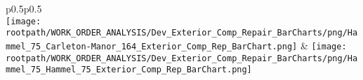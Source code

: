                         \begin{center}
                        \tablehead{\hspace{1cm}\\}
                        \tabletail{\hspace{1cm}\\}
                        \begin{supertabular}{p{0.5\textwidth}p{0.5\textwidth}}
                         \\
                        \texttt{[image: \\rootpath/WORK\_ORDER\_ANALYSIS/Dev\_Exterior\_Comp\_Repair\_BarCharts/png/Hammel\_75\_Carleton-Manor\_164\_Exterior\_Comp\_Rep\_BarChart.png]} & \texttt{[image: \\rootpath/WORK\_ORDER\_ANALYSIS/Dev\_Exterior\_Comp\_Repair\_BarCharts/png/Hammel\_75\_Hammel\_75\_Exterior\_Comp\_Rep\_BarChart.png]} \\
                                        \end{supertabular}
\end{center}
